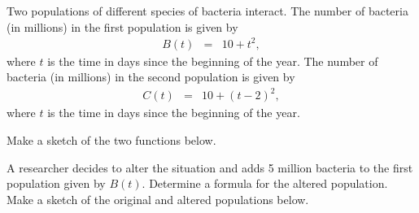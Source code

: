 
\begin{problem}
\item Two populations of different species of bacteria interact. The
  number of bacteria (in millions) in the first population is given by
  \begin{eqnarray*}
    B(t) & = & 10 + t^2,
  \end{eqnarray*}
  where $t$ is the time in days since the beginning of the year.  The
  number of bacteria (in millions) in the second population is given by
  \begin{eqnarray*}
    C(t) & = & 10+(t-2)^2,
  \end{eqnarray*}
  where $t$ is the time in days since the beginning of the year.
  \begin{subproblem}
  \item Make a sketch of the two functions below.
    \vfill
  \item A researcher decides to alter the situation and adds 5 million
    bacteria to the first population given by $B(t)$. Determine a
    formula for the altered population. Make a sketch of the original
    and altered populations below.
    \vfill
  \end{subproblem}

\end{problem}



